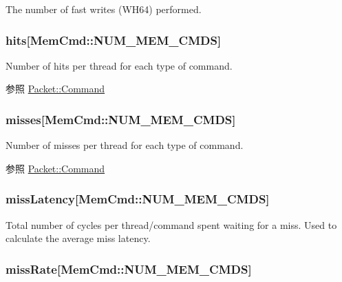 \label{group__CacheStatistics_gaaa4a7e9f5dcb48cc5a53ac2335e934b3}
The number of fast writes (WH64) performed. \hypertarget{group__CacheStatistics_gad6a8ff96d397437943d0a35012008e84}{
\subsubsection[{hits}]{ hits\mbox{[}MemCmd::NUM\_\-MEM\_\-CMDS\mbox{]}}}
\label{group__CacheStatistics_gad6a8ff96d397437943d0a35012008e84}
Number of hits per thread for each type of command. \begin{DoxySeeAlso}{参照}
\hyperlink{classPacket_a1f48acf35af3589c5f137c85deff8e85}{Packet::Command} 
\end{DoxySeeAlso}
\hypertarget{group__CacheStatistics_gaef820137ee3e0d7ce5895019f76e1ad7}{
\subsubsection[{misses}]{ misses\mbox{[}MemCmd::NUM\_\-MEM\_\-CMDS\mbox{]}}}
\label{group__CacheStatistics_gaef820137ee3e0d7ce5895019f76e1ad7}
Number of misses per thread for each type of command. \begin{DoxySeeAlso}{参照}
\hyperlink{classPacket_a1f48acf35af3589c5f137c85deff8e85}{Packet::Command} 
\end{DoxySeeAlso}
\hypertarget{group__CacheStatistics_gaf96751c776ee651f3284e22686b8978a}{
\subsubsection[{missLatency}]{ missLatency\mbox{[}MemCmd::NUM\_\-MEM\_\-CMDS\mbox{]}}}
\label{group__CacheStatistics_gaf96751c776ee651f3284e22686b8978a}
Total number of cycles per thread/command spent waiting for a miss. Used to calculate the average miss latency. \hypertarget{group__CacheStatistics_gabe84abb4bee43d594923487ba5e013c1}{
\subsubsection[{missRate}]{ missRate\mbox{[}MemCmd::NUM\_\-MEM\_\-CMDS\mbox{]}}}
